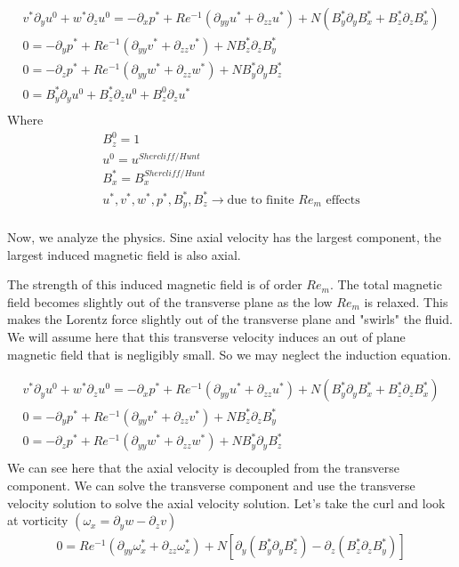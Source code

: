 \documentclass[11pt]{article}
\newcommand{\PD}{\partial}
\begin{document}
\begin{equation}\begin{aligned}
v^* \PD_y u^0 + w^* \PD_z u^0 = -\PD_x p^* + Re^{-1} (\PD_{yy} u^* + \PD_{zz} u^*) + N (B_y^* \PD_y B_x^* + B_z^* \PD_z B_x^*) \\
0 = -\PD_y p^* + Re^{-1} (\PD_{yy} v^* + \PD_{zz} v^*) + N B_z^* \PD_z B_y^* \\
0 = -\PD_z p^* + Re^{-1} (\PD_{yy} w^* + \PD_{zz} w^*) + N B_y^* \PD_y B_z^* \\
0 =  B_y^{*} \PD_y u^0 + B_z^{*} \PD_z u^0 + B_z^0 \PD_z u^* \\
\end{aligned}\end{equation}
Where
\begin{equation}\begin{aligned}
B_z^0 = 1 \\
u^0 = u^{Shercliff /  Hunt} \\
B_x^* = B_x^{Shercliff /  Hunt} \\
u^*,v^*,w^*,p^*,B_y^*,B_z^* \rightarrow \text{due to finite $Re_m$ effects} \\
\end{aligned}\end{equation}



Now, we analyze the physics. Sine axial velocity has the largest component, the largest induced magnetic field is also axial.

The strength of this induced magnetic field is of order $Re_m$. The total magnetic field becomes slightly out of 
the transverse plane as the low $Re_m$ is relaxed. This makes the Lorentz force slightly out of the transverse plane
and "swirls" the fluid. We will assume here that this transverse velocity induces an out of plane magnetic field that 
is negligibly small. So we may neglect the induction equation. 

\begin{equation}\begin{aligned}
v^* \PD_y u^0 + w^* \PD_z u^0 = -\PD_x p^* + Re^{-1} (\PD_{yy} u^* + \PD_{zz} u^*) + N (B_y^* \PD_y B_x^* + B_z^* \PD_z B_x^*) \\
0 = -\PD_y p^* + Re^{-1} (\PD_{yy} v^* + \PD_{zz} v^*) + N B_z^* \PD_z B_y^* \\
0 = -\PD_z p^* + Re^{-1} (\PD_{yy} w^* + \PD_{zz} w^*) + N B_y^* \PD_y B_z^* \\
\end{aligned}\end{equation}
We can see here that the axial velocity is decoupled from the transverse component. We can solve the transverse component
and use the transverse velocity solution to solve the axial velocity solution. 
Let's take the curl and look at vorticity $(\omega_x = \PD_y w - \PD_z v)$
\begin{equation}\begin{aligned}
0 = Re^{-1} (\PD_{yy} \omega_x^* + \PD_{zz} \omega_x^*) 
+ N \left[ \PD_y (B_y^* \PD_y B_z^*) 
- \PD_z (B_z^* \PD_z B_y^*) \right] \\
\end{aligned}\end{equation}
\end{document}
